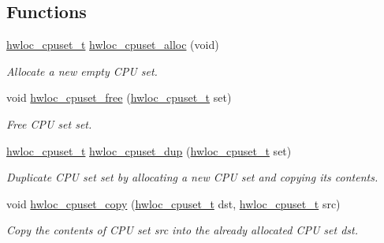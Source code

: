 \subsection*{Functions}
\begin{DoxyCompactItemize}
\item 
\hyperlink{group__hwlocality__cpuset_ga7366332f7090f5b54d4b25a0c2c4b411}{hwloc\_\-cpuset\_\-t} \hyperlink{group__hwlocality__cpuset_ga82803256c7e78369aad77a2a9e5599a2}{hwloc\_\-cpuset\_\-alloc} (void)
\begin{DoxyCompactList}\small\item\em Allocate a new empty CPU set. \item\end{DoxyCompactList}\item 
void \hyperlink{group__hwlocality__cpuset_gaf5d5a9e082a43f8311fdcff55e611b23}{hwloc\_\-cpuset\_\-free} (\hyperlink{group__hwlocality__cpuset_ga7366332f7090f5b54d4b25a0c2c4b411}{hwloc\_\-cpuset\_\-t} set)
\begin{DoxyCompactList}\small\item\em Free CPU set {\ttfamily set}. \item\end{DoxyCompactList}\item 
\hyperlink{group__hwlocality__cpuset_ga7366332f7090f5b54d4b25a0c2c4b411}{hwloc\_\-cpuset\_\-t} \hyperlink{group__hwlocality__cpuset_ga19d8c163e4834ba69c808560aa5a89b3}{hwloc\_\-cpuset\_\-dup} (\hyperlink{group__hwlocality__cpuset_ga7366332f7090f5b54d4b25a0c2c4b411}{hwloc\_\-cpuset\_\-t} set)
\begin{DoxyCompactList}\small\item\em Duplicate CPU set {\ttfamily set} by allocating a new CPU set and copying its contents. \item\end{DoxyCompactList}\item 
void \hyperlink{group__hwlocality__cpuset_gadad3d25553afca090a81ffa270208f2e}{hwloc\_\-cpuset\_\-copy} (\hyperlink{group__hwlocality__cpuset_ga7366332f7090f5b54d4b25a0c2c4b411}{hwloc\_\-cpuset\_\-t} dst, \hyperlink{group__hwlocality__cpuset_ga7366332f7090f5b54d4b25a0c2c4b411}{hwloc\_\-cpuset\_\-t} src)
\begin{DoxyCompactList}\small\item\em Copy the contents of CPU set {\ttfamily src} into the already allocated CPU set {\ttfamily dst}. \item\end{DoxyCompactList}\item 

\end{DoxyCompactItemize}
